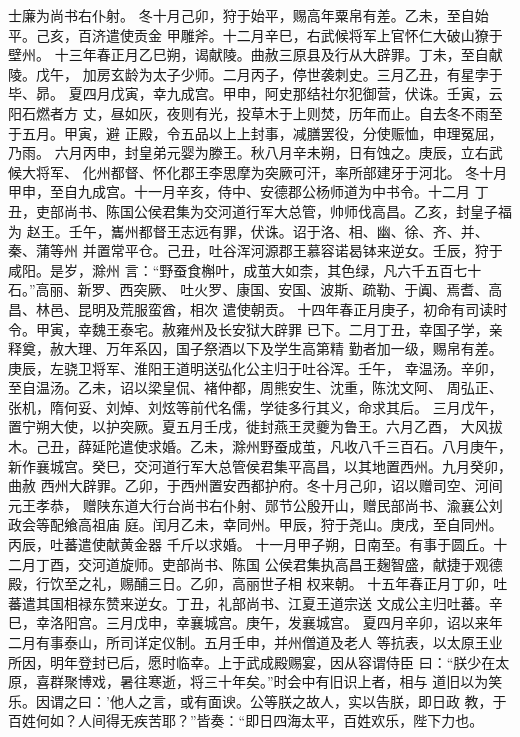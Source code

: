 \documentclass[12pt,UTF8]{ctexbook}
\begin{document}
士廉为尚书右仆射。
冬十月己卯，狩于始平，赐高年粟帛有差。乙未，至自始平。己亥，百济遣使贡金
甲雕斧。十二月辛巳，右武候将军上官怀仁大破山獠于壁州。
十三年春正月乙巳朔，谒献陵。曲赦三原县及行从大辟罪。丁未，至自献陵。戊午，
加房玄龄为太子少师。二月丙子，停世袭刺史。三月乙丑，有星孛于毕、昴。
夏四月戊寅，幸九成宫。甲申，阿史那结社尔犯御营，伏诛。壬寅，云阳石燃者方
丈，昼如灰，夜则有光，投草木于上则焚，历年而止。自去冬不雨至于五月。甲寅，避
正殿，令五品以上上封事，减膳罢役，分使赈恤，申理冤屈，乃雨。
六月丙申，封皇弟元婴为滕王。秋八月辛未朔，日有蚀之。庚辰，立右武候大将军、
化州都督、怀化郡王李思摩为突厥可汗，率所部建牙于河北。
冬十月甲申，至自九成宫。十一月辛亥，侍中、安德郡公杨师道为中书令。十二月
丁丑，吏部尚书、陈国公侯君集为交河道行军大总管，帅师伐高昌。乙亥，封皇子福为
赵王。壬午，巂州都督王志远有罪，伏诛。诏于洛、相、幽、徐、齐、并、秦、蒲等州
并置常平仓。己丑，吐谷浑河源郡王慕容诺曷钵来逆女。壬辰，狩于咸阳。是岁，滁州
言：“野蚕食槲叶，成茧大如柰，其色绿，凡六千五百七十石。”高丽、新罗、西突厥、
吐火罗、康国、安国、波斯、疏勒、于阗、焉耆、高昌、林邑、昆明及荒服蛮酋，相次
遣使朝贡。
十四年春正月庚子，初命有司读时令。甲寅，幸魏王泰宅。赦雍州及长安狱大辟罪
已下。二月丁丑，幸国子学，亲释奠，赦大理、万年系囚，国子祭酒以下及学生高第精
勤者加一级，赐帛有差。庚辰，左骁卫将军、淮阳王道明送弘化公主归于吐谷浑。壬午，
幸温汤。辛卯，至自温汤。乙未，诏以梁皇侃、褚仲都，周熊安生、沈重，陈沈文阿、
周弘正、张机，隋何妥、刘焯、刘炫等前代名儒，学徒多行其义，命求其后。
三月戊午，置宁朔大使，以护突厥。夏五月壬戌，徙封燕王灵夔为鲁王。六月乙酉，
大风拔木。己丑，薛延陀遣使求婚。乙未，滁州野蚕成茧，凡收八千三百石。八月庚午，
新作襄城宫。癸巳，交河道行军大总管侯君集平高昌，以其地置西州。九月癸卯，曲赦
西州大辟罪。乙卯，于西州置安西都护府。冬十月己卯，诏以赠司空、河间元王孝恭，
赠陕东道大行台尚书右仆射、郧节公殷开山，赠民部尚书、渝襄公刘政会等配飨高祖庙
庭。闰月乙未，幸同州。甲辰，狩于尧山。庚戌，至自同州。丙辰，吐蕃遣使献黄金器
千斤以求婚。
十一月甲子朔，日南至。有事于圆丘。十二月丁酉，交河道旋师。吏部尚书、陈国
公侯君集执高昌王麹智盛，献捷于观德殿，行饮至之礼，赐酺三日。乙卯，高丽世子相
权来朝。
十五年春正月丁卯，吐蕃遣其国相禄东赞来逆女。丁丑，礼部尚书、江夏王道宗送
文成公主归吐蕃。辛巳，幸洛阳宫。三月戊申，幸襄城宫。庚午，发襄城宫。
夏四月辛卯，诏以来年二月有事泰山，所司详定仪制。五月壬申，并州僧道及老人
等抗表，以太原王业所因，明年登封已后，愿时临幸。上于武成殿赐宴，因从容谓侍臣
曰：“朕少在太原，喜群聚博戏，暑往寒逝，将三十年矣。”时会中有旧识上者，相与
道旧以为笑乐。因谓之曰：’他人之言，或有面谀。公等朕之故人，实以告朕，即日政
教，于百姓何如？人间得无疾苦耶？”皆奏：“即日四海太平，百姓欢乐，陛下力也。
\end{document}
